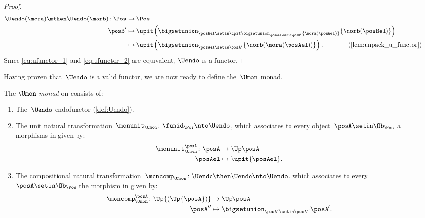 \begin{proof}
\begin{equation}
\begin{aligned}
            \Uendo(\mora)\mthen \Uendo(\morb)\colon \Pos & \to \Pos \\
            \posB'                                       & \mapsto \upit\left( \bigsetunion_{\posBel\setin \upit \bigsetunion_{\posAel\setin \posB'}\{\mora(\posAel)\}}\{\morb(\posBel)\}\right) \\
                                                         & \mapsto \upit \left(\bigsetunion_{\posAel\setin \posA'} \{ \morb(\mora(\posAel))\}\right).
            \qquad \qquad (\cref{lem:unpack_u_functor})
        \end{aligned}
    \end{equation}
    Since \cref{eq:ufunctor_1} and \cref{eq:ufunctor_2} are equivalent, $\Uendo$ is a functor.
\end{proof}
Having proven that~$\Uendo$ is a valid functor, we are now ready to define the~$\Umon$ monad.
\begin{definition}
    \label{def:Umon}
    The \emph{$\Umon$ monad} on \Pos consists of:
    \begin{enumerate}
        \item The~$\Uendo$ endofunctor (\cref{def:Uendo}).
        \item The unit natural transformation~$\monunit_{\Umon} \colon \funid_{\Pos}\nto \Uendo$, which associates to every object~$\posA \setin \Ob_\Pos$ a morphisms in \Pos given by:
              \begin{equation}
                  \begin{aligned}
                      \monunit_{\Umon}^\posA\colon \posA & \to \Up \posA \\
                      \posAel                            & \mapsto \upit \{\posAel\}.
                  \end{aligned}
              \end{equation}
        \item The compositional natural transformation~$\moncomp_{\Umon}\colon \Uendo\then \Uendo\nto \Uendo$, which associates to every~$\posA\setin \Ob_\Pos$ the morphism in \Pos given by:
              \begin{equation}
                  \begin{aligned}
                      \moncomp_{\Umon}^\posA\colon \Up{(\Up{\posA})} & \to \Up \posA \\
                      \posA''                                        & \mapsto \bigsetunion_{\posA'\setin \posA''}\posA'.
                  \end{aligned}
              \end{equation}
    \end{enumerate}
\end{definition}

